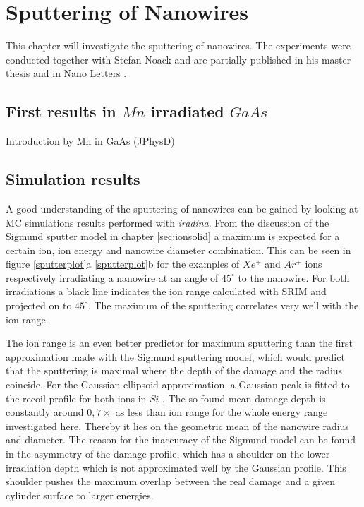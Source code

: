 \chapter{Sputtering of Nanowires}

This chapter will investigate the sputtering of nanowires. The experiments were conducted together with Stefan Noack and are partially published in his master thesis \cite{noack_sputter_2014} and in Nano Letters \cite{}.

\section{First results in $Mn$ irradiated $GaAs$}

Introduction by Mn in GaAs (JPhysD)


\section{Simulation results}
\label{sec:simsputering}

A good understanding of the sputtering of nanowires can be gained by looking at MC simulations results performed with \emph{iradina}. From the discussion of the Sigmund sputter model in chapter \ref{sec:ionsolid} a maximum is expected for a certain ion, ion energy and nanowire diameter combination. This can be seen in figure \ref{sputterplot}a \ref{sputterplot}b for the examples of $Xe^+$ and $Ar^+$ ions respectively irradiating a nanowire at an angle of $45^\circ$ to the nanowire. For both irradiations a black line indicates the ion range calculated with SRIM and projected on to $45^\circ$. The maximum of the sputtering correlates very well with the ion range. 

The ion range is an even better predictor for maximum sputtering than the first approximation made with the Sigmund sputtering model, which would predict that the sputtering is maximal where the depth of the damage and the radius coincide. For the Gaussian ellipsoid approximation, a Gaussian peak is fitted to the recoil profile for both ions in $Si$ \cite{bobes_ion_2012}. The so found mean damage depth is constantly around $0,7\times$ as less than ion range for the whole energy range investigated here. Thereby it lies on the geometric mean of the nanowire radius and diameter. The reason for the inaccuracy of the Sigmund model can be found in the asymmetry of the damage profile, which has a shoulder on the lower irradiation depth which is not approximated well by the Gaussian profile. This shoulder pushes the maximum overlap between the real damage and a given cylinder surface to larger energies.


